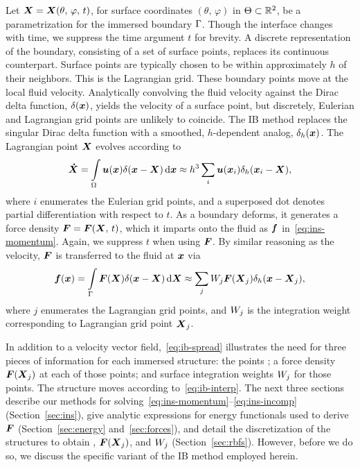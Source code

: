 Let $\boldsymbol{X} = \boldsymbol{X}(\theta,\,\varphi,\,t)$, for surface coordinates $(\theta,\,\varphi)$ in
$\Theta\subset\mathbb{R}^2$, be a parametrization for the immersed boundary $\Gamma$.
Though the interface changes with time, we suppress the time argument $t$ for brevity. A
discrete representation of the boundary, consisting of a set of surface points, replaces
its continuous counterpart.  Surface points are typically chosen to be within
approximately $h$ of their neighbors.  This is the Lagrangian grid. These boundary points
move at the local fluid velocity.  Analytically convolving the fluid velocity against the
Dirac delta function, $\delta(\boldsymbol{x})$, yields the velocity of a surface point, but
discretely, Eulerian and Lagrangian grid points are unlikely to coincide. The IB method
replaces the singular Dirac delta function with a smoothed, $h$-dependent analog,
$\delta_h(\boldsymbol{x})$. The Lagrangian point $\boldsymbol{X}$ evolves according to
\begin{equation}\label{eq:ib-interp}
    \vec{\dot{X}}
        = \int\limits_{\domain} \u(\x) \Dirac(\x-\X) \d\x
        \approx h^3 \sum_{i} \u(\x_i) \Dirac_h(\x_i-\X),
\end{equation}
where $i$ enumerates the Eulerian grid points, and a superposed dot denotes partial
differentiation with respect to $t$. As a boundary deforms, it generates a force density
$\boldsymbol{F} = \boldsymbol{F}(\boldsymbol{X},\,t)$, which it imparts onto the fluid as $\boldsymbol{f}$ in~\eqref{eq:ins-momentum}.
Again, we suppress $t$ when using $\boldsymbol{F}$. By similar reasoning as the velocity, $\boldsymbol{F}$ is
transferred to the fluid at $\boldsymbol{x}$ via
\begin{equation}\label{eq:ib-spread}
        \f(\x)
        = \int\limits_{\interface} \F(\X)\Dirac(\x-\X) \d\X
        \approx \sum_{j} \weight[j]\F(\X_j) \Dirac_h(\x-\X_j),
\end{equation}
where $j$ enumerates the Lagrangian grid points, and $\weight[j]$ is the integration
weight corresponding to Lagrangian grid point $\boldsymbol{X}_j$. 

In addition to a velocity vector field,~\eqref{eq:ib-spread} illustrates the need for
three pieces of information for each immersed structure: the points ; a force density $\boldsymbol{F}(\boldsymbol{X}_j)$ at each of those points;
and surface integration weights $\weight[j]$ for those points. The structure moves
according to~\eqref{eq:ib-interp}. The next three sections describe our methods for
solving~\eqref{eq:ins-momentum}--\eqref{eq:ins-incomp} (Section~\ref{sec:ins}), give
analytic expressions for energy functionals used to derive $\boldsymbol{F}$ (Section~\ref{sec:energy}
and~\ref{sec:forces}), and detail the discretization of the structures to obtain
, $\boldsymbol{F}(\boldsymbol{X}_j)$, and $\weight[j]$ (Section~\ref{sec:rbfs}). However, before we
do so, we discuss the specific variant of the IB method employed herein.

